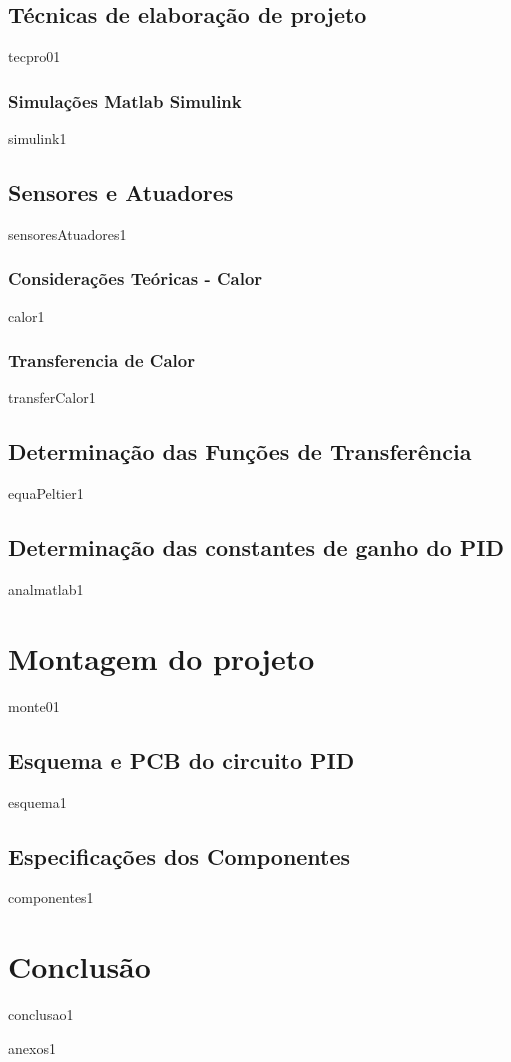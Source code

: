 \documentclass[a4paper, 12pt]{article}
\begin{document}
\subsection{Técnicas de elaboração de projeto}
{tecpro01}

	\subsubsection{Simulações Matlab Simulink }
	{simulink1}
	
\subsection{Sensores e Atuadores}
{sensoresAtuadores1}

	\subsubsection{Considerações Teóricas - Calor }
	{calor1}
	\subsubsection{Transferencia de Calor}
	{transferCalor1}

\subsection{Determinação das Funções de Transferência}
{equaPeltier1}

\subsection{Determinação das constantes de ganho do PID}
{analmatlab1}

\section{Montagem do projeto}
{monte01}

\subsection{Esquema e PCB do circuito PID}
{esquema1}

\subsection{Especificações dos Componentes}
{componentes1}

\section{Conclusão}
{conclusao1}

\newpage


{}

\newpage
{anexos1}
\end{document}
